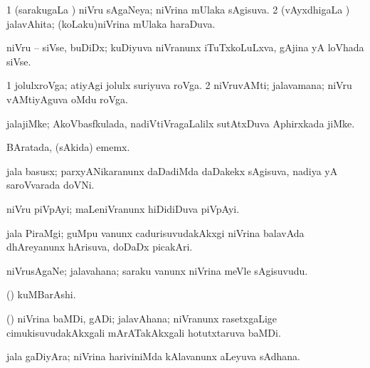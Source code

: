\bentry
{} 
\gl{\gu}
\expl{}
\bmng
\bnum
\num{1} (sarakugaLa \vi) niVru sAgaNeya; niVrina mUlaka sAgisuva. 
\num{2} (vAyxdhigaLa \vi) jalavAhita; (koLaku)niVrina mUlaka haraDuva. 
\enum
\emng
\eentry

\bentry
{} 
\gl{\nA}
\expl{}
\bmng
niVru -- siVse, buDiDx; kuDiyuva niVranunx iTuTxkoLuLxva, gAjina yA loVhada siVse. 
\emng
\eentry

\bentry
{} 
\gl{\nA}
\expl{}
\bmng
\bnum
\num{1} jolulxroVga; atiyAgi jolulx suriyuva roVga. 
\num{2} niVruvAMti; jalavamana; niVru vAMtiyAguva oMdu roVga. 
\enum
\emng
\eentry

\bentry
{} 
\gl{\nA}
\bmng
jalajiMke; AkoVbasfkulada, nadiVtiVragaLalilx sutAtxDuva Aphirxkada jiMke.  
\emng
\eentry

\bentry
{} 
\gl{\nA}
\bmng
BAratada, (sAkida) ememx.  
\emng
\eentry

\bentry
{} 
\gl{\nA}
\expl{}
\bmng
jala basusx; parxyANikaranunx daDadiMda daDakekx sAgisuva, nadiya yA saroVvarada doVNi. 
\emng
\eentry

\bentry
{} 
\gl{\nA}
\expl{}
\bmng
niVru piVpAyi; maLeniVranunx hiDidiDuva piVpAyi. 
\emng
\eentry

\bentry
{} 
\gl{\nA}
\expl{}
\bmng
jala PiraMgi; guMpu \mo vanunx cadurisuvudakAkxgi niVrina balavAda dhAreyanunx hArisuva, doDaDx picakAri. 
\emng
\eentry

\bentry
{} 
\gl{\nA}
\expl{}
\bmng
niVrusAgaNe; jalavahana; saraku \mo vanunx niVrina meVle sAgisuvudu. 
\emng
\eentry

\bentry
{} 
\gl{\nA}
\expl{}
\bmng
(\Kavi) kuMBarAshi. 
\emng
\eentry

\bentry
{} 
\gl{\nA}
\expl{}
\bmng
(\kanmu) niVrina baMDi, gADi; jalavAhana; niVranunx rasetxgaLige cimukisuvudakAkxgali mArATakAkxgali hotutxtaruva baMDi. 
\emng
\eentry

\bentry
{} 
\gl{\nA}
\bmng
jala gaDiyAra; niVrina hariviniMda kAlavanunx aLeyuva sAdhana.  
\emng
\eentry

